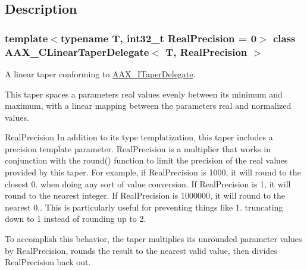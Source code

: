 \subsection{Description}
\subsubsection*{template$<$typename T, int32\+\_\+t Real\+Precision = 0$>$\newline
class A\+A\+X\+\_\+\+C\+Linear\+Taper\+Delegate$<$ T, Real\+Precision $>$}

A linear taper conforming to \mbox{\hyperlink{a01881}{A\+A\+X\+\_\+\+I\+Taper\+Delegate}}. 

This taper spaces a parameter\textquotesingle{}s real values evenly between its minimum and maximum, with a linear mapping between the parameter\textquotesingle{}s real and normalized values.

\begin{DoxyParagraph}{Real\+Precision}
In addition to its type templatization, this taper includes a precision template parameter. Real\+Precision is a multiplier that works in conjunction with the round() function to limit the precision of the real values provided by this taper. For example, if Real\+Precision is 1000, it will round to the closest 0. when doing any sort of value conversion. If Real\+Precision is 1, it will round to the nearest integer. If Real\+Precision is 1000000, it will round to the nearest 0.. This is particularly useful for preventing things like 1. truncating down to 1 instead of rounding up to 2.
\end{DoxyParagraph}
To accomplish this behavior, the taper multiplies its unrounded parameter values by Real\+Precision, rounds the result to the nearest valid value, then divides Real\+Precision back out.

